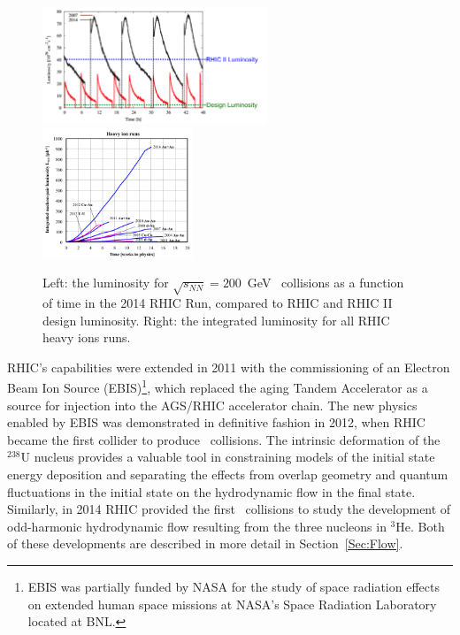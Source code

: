 \begin{figure}[ht]
\centerline{
\includegraphics[width=0.60\textwidth]{fig/RHICLuminosity.png}
\includegraphics[width=0.40\textwidth]{fig/RhicIntegratedLuminosityAA.png}
}
\caption[RHIC luminosity, past and present]{Left: the luminosity for $\sqrt{s_{NN}}=200$~GeV \AuAu\ collisions as a function of time in the 2014 RHIC Run, compared to RHIC and RHIC II design luminosity.
Right: the integrated luminosity for all RHIC heavy ions runs.
}
\label{Fig:RHICLum}
\end{figure}

RHIC's capabilities were extended in 2011 with the commissioning 
of an Electron Beam Ion Source\cite{Alessi:2010zz} 
(EBIS)\footnote{EBIS was partially funded by NASA for the study of space radiation effects on extended human space missions
at NASA's Space Radiation Laboratory located at BNL.}, 
which replaced the aging Tandem Accelerator as a source for injection into the AGS/RHIC accelerator chain. The new physics enabled by EBIS was demonstrated in definitive fashion in 2012, when RHIC became the first collider to produce \UU\ collisions. 
The intrinsic deformation of the ${}^{238}$U nucleus provides a valuable tool 
in constraining models of the initial state energy deposition 
and separating the effects from overlap geometry and quantum fluctuations in the initial state on the hydrodynamic flow in the final state.
Similarly, in 2014 RHIC provided the first \HeAu\ collisions to study the development of odd-harmonic hydrodynamic flow resulting from the three nucleons in ${}^3$He. Both of these developments are described in more detail in Section~\ref{Sec:Flow}.

